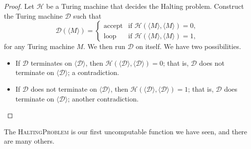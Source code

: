 \begin{proof}
  Let $\mathcal H$ be a Turing machine that decides the Halting problem. Construct the Turing machine $\mathcal D$ such that
  \[\mathcal D(\langle M \rangle) = \begin{cases}
    \text{accept} & \text{if $\mathcal H(\langle M \rangle, \langle M \rangle) = 0$}, \\
    \text{loop} & \text{if $\mathcal H(\langle M \rangle, \langle M \rangle) = 1$},
  \end{cases}\]
  for any Turing machine $M$. We then run $\mathcal D$ on itself. We have two possibilities.
  \begin{itemize}
    \item If $\mathcal D$ terminates on $\langle \mathcal D \rangle$, then $\mathcal H(\langle \mathcal D \rangle, \langle \mathcal D \rangle) = 0$; that is, $\mathcal D$ does not terminate on $\langle \mathcal D \rangle$; a contradiction.
    \item If $\mathcal D$ does not terminate on $\langle \mathcal D \rangle$, then $\mathcal H(\langle \mathcal D \rangle, \langle \mathcal D \rangle) = 1$; that is, $\mathcal D$ does terminate on $\langle \mathcal D \rangle$; another contradiction. 
  \end{itemize}
\end{proof}

The \textsc{HaltingProblem} is our first uncomputable function we have seen, and there are many others. 
